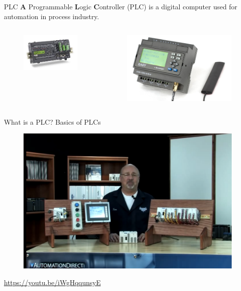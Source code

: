 \begin{frame}{PLC}
	\textbf A {P}rogrammable \textbf{L}ogic \textbf{C}ontroller (PLC) is a digital computer used for automation in process industry. 
	\begin{columns}
		\begin{column}{0.5\textwidth}
			\begin{figure}
				\centering
				\includegraphics[width=0.7\linewidth]{img/PLC_1}
			\end{figure}

		\end{column}
		\begin{column}{0.5\textwidth}
			\begin{figure}
				\centering
				\includegraphics[width=0.7\linewidth]{img/PLC_2}
			\end{figure}
		\end{column}
	\end{columns}
\end{frame}

\begin{frame}{What is a PLC? Basics of PLCs}
	\begin{figure}
		\centering
		\includegraphics[width=0.7\linewidth]{img/what_is_a_plc}
	\end{figure}
	\url{https://youtu.be/iWgHqqunsyE}
\end{frame}

